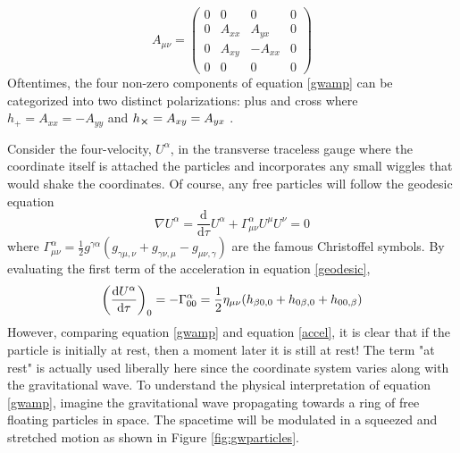 	\begin{equation} \label{gwamp}
	A_{\mu \nu} = 
	\begin{pmatrix}
			0 &    0   &  0      & 0 
		 \\ 0 & A_{xx} &  A_{yx} & 0
		 \\ 0 & A_{xy} & -A_{xx} & 0
		 \\ 0 &    0   &  0      & 0
	\end{pmatrix}
	\end{equation}
	Oftentimes, the four non-zero components of equation \ref{gwamp} can be categorized into two distinct polarizations: plus and cross where $h_{+} = A_{xx} = -A_{yy}$ and $h_{\cross} = A_{xy} = A_{yx}$ .
 
	Consider the four-velocity, $U^{\alpha}$, in the transverse traceless gauge where the coordinate itself is attached the particles and incorporates any small wiggles that would shake the coordinates.  Of course, any free particles will follow the geodesic equation
	\begin{equation}\label{geodesic}
	\nabla U^{\alpha} = \frac{\text{d}}{\text{d} \tau} U^{\alpha} + \Gamma^{\alpha}_{\mu \nu} U^{\mu} U^{\nu} = 0
	\end{equation}	
	where $\Gamma^{\alpha}_{\mu \nu} = \frac{1}{2} g^{\gamma \alpha}(g_{\gamma \mu, \nu} + g_{\gamma \nu,\mu} - g_{\mu \nu, \gamma} )$ are the famous Christoffel symbols.
	By evaluating the first term of the acceleration in equation \ref{geodesic},
	\begin{equation}\label{accel}
	\bigg(\frac{\text{d}U^{\alpha}}{\text{d}\tau}\bigg)_0 = -\Gamma^{\alpha}_{00} 
	\\ = \frac{1}{2} \eta_{\mu \nu} (h_{\beta 0, 0} + h_{0 \beta, 0} + h_{0 0, \beta} )
	\end{equation}	
	However, comparing equation \ref{gwamp} and equation \ref{accel}, it is clear that if the particle is initially at rest, then a moment later it is still at rest! The term "at rest" is actually used liberally here since the coordinate system varies along with the gravitational wave.  To understand the physical interpretation of equation \ref{gwamp}, imagine the gravitational wave propagating towards a ring of free floating particles in space.  The spacetime will be modulated in a squeezed and stretched motion as shown in Figure \ref{fig:gwparticles}.  
	
